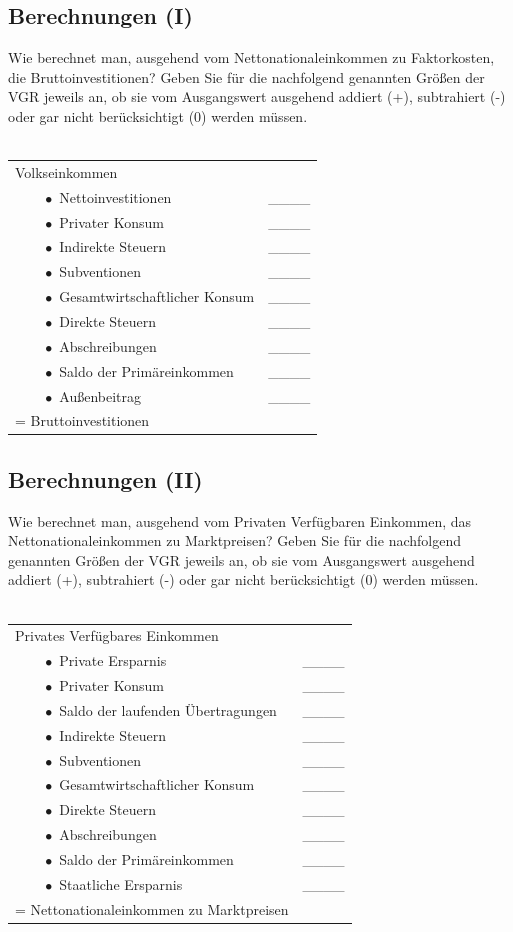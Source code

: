 \documentclass{scrartcl}
\begin{document}
\subsection{Berechnungen (I)}
Wie berechnet man, ausgehend vom Nettonationaleinkommen zu Faktorkosten, die Bruttoinvestitionen? Geben Sie für die nachfolgend genannten Größen der VGR jeweils an, ob sie vom Ausgangswert ausgehend addiert (+), subtrahiert (-) oder gar nicht berücksichtigt (0) werden müssen.\\~\\
\begin{tabular}{ll}
	Volkseinkommen & \\
	$\qquad\bullet$ Nettoinvestitionen &  \_\_\_\_ \\
	$\qquad\bullet$ Privater Konsum &  \_\_\_\_ \\
	$\qquad\bullet$ Indirekte Steuern &  \_\_\_\_ \\
	$\qquad\bullet$ Subventionen &  \_\_\_\_ \\
	$\qquad\bullet$ Gesamtwirtschaftlicher Konsum &  \_\_\_\_ \\
	$\qquad\bullet$ Direkte Steuern &  \_\_\_\_ \\
	$\qquad\bullet$ Abschreibungen &  \_\_\_\_ \\
	$\qquad\bullet$ Saldo der Primäreinkommen &  \_\_\_\_ \\
	$\qquad\bullet$ Außenbeitrag &  \_\_\_\_ \\
	= Bruttoinvestitionen  &
\end{tabular}

\subsection{Berechnungen (II)}
Wie berechnet man, ausgehend vom Privaten Verfügbaren Einkommen, das Nettonationaleinkommen zu Marktpreisen? Geben Sie für die nachfolgend genannten Größen der VGR jeweils an, ob sie vom Ausgangswert ausgehend addiert (+), subtrahiert (-) oder gar nicht berücksichtigt (0) werden müssen.\\~\\
\begin{tabular}{ll}
	Privates Verfügbares Einkommen & \\
	$\qquad\bullet$ Private Ersparnis &  \_\_\_\_ \\
	$\qquad\bullet$ Privater Konsum &  \_\_\_\_ \\
	$\qquad\bullet$ Saldo der laufenden Übertragungen &  \_\_\_\_ \\
	$\qquad\bullet$ Indirekte Steuern &  \_\_\_\_ \\
	$\qquad\bullet$ Subventionen &  \_\_\_\_ \\
	$\qquad\bullet$ Gesamtwirtschaftlicher Konsum &  \_\_\_\_ \\
	$\qquad\bullet$ Direkte Steuern &  \_\_\_\_ \\
	$\qquad\bullet$ Abschreibungen &  \_\_\_\_ \\
	$\qquad\bullet$ Saldo der Primäreinkommen &  \_\_\_\_ \\
	$\qquad\bullet$ Staatliche Ersparnis &  \_\_\_\_ \\
	= Nettonationaleinkommen zu Marktpreisen  &
\end{tabular}
\newpage
\end{document}
